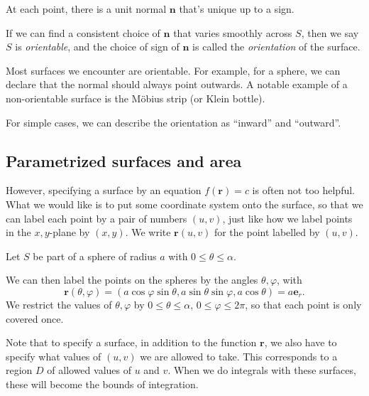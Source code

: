 \documentclass[a4paper]{article}
\begin{document}
\begin{defi}
  At each point, there is a unit normal $\mathbf{n}$ that's unique up to a sign.

  If we can find a consistent choice of $\mathbf{n}$ that varies smoothly across $S$, then we say $S$ is \emph{orientable}, and the choice of sign of $\mathbf{n}$ is called the \emph{orientation} of the surface.
\end{defi}
Most surfaces we encounter are orientable. For example, for a sphere, we can declare that the normal should always point outwards. A notable example of a non-orientable surface is the M\"obius strip (or Klein bottle).

For simple cases, we can describe the orientation as ``inward'' and ``outward''.

\subsection{Parametrized surfaces and area}
However, specifying a surface by an equation $f(\mathbf{r}) = c$ is often not too helpful. What we would like is to put some coordinate system onto the surface, so that we can label each point by a pair of numbers $(u, v)$, just like how we label points in the $x,y$-plane by $(x, y)$. We write $\mathbf{r}(u, v)$ for the point labelled by $(u, v)$.

\begin{eg}
  Let $S$ be part of a sphere of radius $a$ with $0 \leq \theta \leq \alpha$.
  \begin{center}
  \end{center}
  We can then label the points on the spheres by the angles $\theta, \varphi$, with
  \[
    \mathbf{r}(\theta, \varphi) = (a\cos\varphi\sin \theta, a\sin \theta\sin \varphi, a\cos \theta) = a\mathbf{e}_r.
  \]
  We restrict the values of $\theta, \varphi$ by $0 \leq \theta \leq \alpha$, $0 \leq \varphi \leq 2\pi$, so that each point is only covered once.
\end{eg}
Note that to specify a surface, in addition to the function $\mathbf{r}$, we also have to specify what values of $(u, v)$ we are allowed to take. This corresponds to a region $D$ of allowed values of $u$ and $v$. When we do integrals with these surfaces, these will become the bounds of integration.
\end{document}
